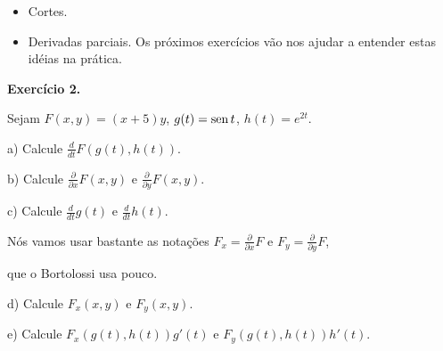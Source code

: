 \documentclass[oneside,12pt]{article}
\begin{document}
\begin{itemize}

\item Cortes. 


\item Derivadas parciais.  Os próximos exercícios vão nos ajudar a entender estas
  idéias na prática.


\end{itemize}


\newpage


{\bf Exercício 2.}

\ssk

Sejam $F(x,y) = (x+5)y$, $g(t) = \operatorname{sen} t$, $h(t) = e^{2t}$.

a) Calcule $\frac{d}{dt} F(g(t),h(t))$.

b) Calcule $\frac{∂}{∂x}F(x,y)$ e $\frac{∂}{∂y}F(x,y)$.

c) Calcule $\frac{d}{dt}g(t)$ e $\frac{d}{dt}h(t)$.

\msk

Nós vamos usar bastante as notações $F_x = \frac{∂}{∂x}F$ e $F_y =
\frac{∂}{∂y}F$,

que o Bortolossi usa pouco.

d) Calcule $F_x(x,y)$ e $F_y(x,y)$.

e) Calcule $F_x(g(t),h(t))g'(t)$ e $F_y(g(t),h(t))h'(t)$.
\end{document}
